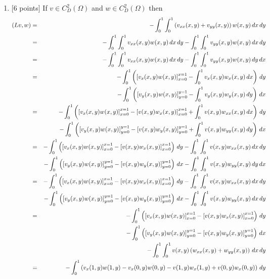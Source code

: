 \begin{solution}
\begin{enumerate}
\item {[6 points]} If $v\in C^2_D(\Omega)$ and $w\in C^2_D(\Omega)$ then
\begin{eqnarray*}
\ip{Lv,w} &=& -\int_0^1 \int_0^1 \left(v_{xx}(x,y)+v_{yy}(x,y)\right) w(x,y)\,dx\,dy
\\
&=& -\int_0^1 \int_0^1 v_{xx}(x,y)w(x,y)\,dx\,dy-\int_0^1 \int_0^1 v_{yy}(x,y)w(x,y)\,dx\,dy
\\
&=& -\int_0^1 \int_0^1 v_{xx}(x,y)w(x,y)\,dx\,dy-\int_0^1 \int_0^1 v_{yy}(x,y)w(x,y)\,dy\,dx
\\
&=& -\int_0^1 \left(\left[v_x(x,y)w(x,y)\right]_{x=0}^{x=1}-\int_0^1 v_x(x,y)w_x(x,y)\,dx\right)\,dy
\\
&&-\int_0^1 \left(\left[v_y(x,y)w(x,y)\right]_{y=0}^{y=1}-\int_0^1 v_y(x,y)w_y(x,y)\,dy\right)\,dx
\\
&=& -\int_0^1 \left(\left[v_x(x,y)w(x,y)\right]_{x=0}^{x=1}-\left[v(x,y)w_x(x,y)\right]_{x=0}^{x=1}+\int_0^1 v(x,y)w_{xx}(x,y)\,dx\right)\,dy
\\
&&-\int_0^1 \left(\left[v_y(x,y)w(x,y)\right]_{y=0}^{y=1}-\left[v(x,y)w_y(x,y)\right]_{y=0}^{y=1}+\int_0^1 v(x,y)w_{yy}(x,y)\,dy\right)\,dx
\\
&=& -\int_0^1 \left(\left[v_x(x,y)w(x,y)\right]_{x=0}^{x=1}-\left[v(x,y)w_x(x,y)\right]_{x=0}^{x=1}\right)\,dy-\int_0^1\int_0^1 v(x,y)w_{xx}(x,y)\,dx\,dy
\\
&&-\int_0^1 \left(\left[v_y(x,y)w(x,y)\right]_{y=0}^{y=1}-\left[v(x,y)w_y(x,y)\right]_{y=0}^{y=1}\right)\,dx-\int_0^1\int_0^1 v(x,y)w_{yy}(x,y)\,dy\,dx
\\
&=& -\int_0^1 \left(\left[v_x(x,y)w(x,y)\right]_{x=0}^{x=1}-\left[v(x,y)w_x(x,y)\right]_{x=0}^{x=1}\right)\,dy-\int_0^1\int_0^1 v(x,y)w_{xx}(x,y)\,dx\,dy
\\
&&-\int_0^1 \left(\left[v_y(x,y)w(x,y)\right]_{y=0}^{y=1}-\left[v(x,y)w_y(x,y)\right]_{y=0}^{y=1}\right)\,dx-\int_0^1\int_0^1 v(x,y)w_{yy}(x,y)\,dx\,dy
\\
&=& -\int_0^1 \left(\left[v_x(x,y)w(x,y)\right]_{x=0}^{x=1}-\left[v(x,y)w_x(x,y)\right]_{x=0}^{x=1}\right)\,dy
\\
&&-\int_0^1 \left(\left[v_y(x,y)w(x,y)\right]_{y=0}^{y=1}-\left[v(x,y)w_y(x,y)\right]_{y=0}^{y=1}\right)\,dx
\\
&&-\int_0^1\int_0^1 v(x,y)\left(w_{xx}(x,y)+w_{yy}(x,y)\right)\,dx\,dy
\\
&=& -\int_0^1 \left(v_x(1,y)w(1,y)-v_x(0,y)w(0,y)-v(1,y)w_x(1,y)+v(0,y)w_x(0,y)\right)\,dy

\end{eqnarray*}
\end{enumerate}
\end{solution}
